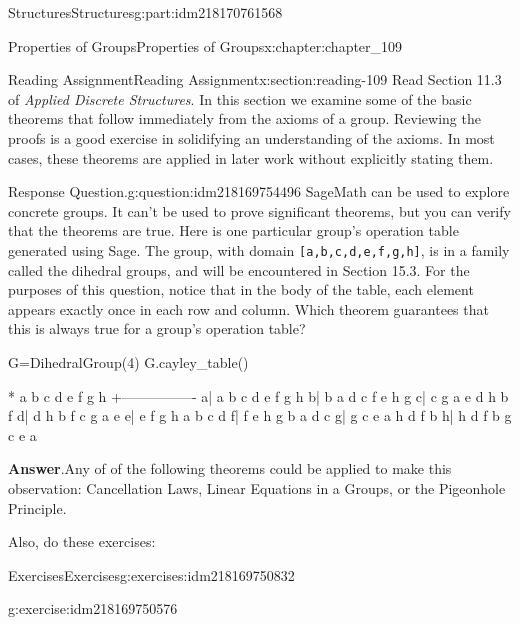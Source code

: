 \documentclass[oneside,10pt,]{book}
\newcommand{\blocktitlefont}{\relax}
\newcommand{\mono}[1]{\texttt{#1}}
\numberwithin{equation}{section}
\begin{document}
\begin{partptx}{Structures}{}{Structures}{}{}{g:part:idm218170761568}
\begin{chapterptx}{Properties of Groups}{}{Properties of Groups}{}{}{x:chapter:chapter_109}
\typeout{************************************************}
%
\begin{sectionptx}{Reading Assignment}{}{Reading Assignment}{}{}{x:section:reading-109}
Read Section 11.3 of \emph{Applied Discrete Structures}.  In this section we examine some of the basic theorems that follow immediately from the axioms of a group. Reviewing the proofs is a good exercise in solidifying an understanding of the axioms. In most cases, these theorems are applied in later work without explicitly stating them.%
\begin{question}{Response Question.}{g:question:idm218169754496}%
SageMath can be used to explore concrete groups.  It can't be used to prove significant theorems, but you can verify that the theorems are true.  Here is one particular group's operation table generated using Sage. The group, with domain \mono{[a,b,c,d,e,f,g,h]}, is in a family called the dihedral groups, and will be encountered in Section 15.3. For the purposes of this question, notice that in the body of the table, each element appears exactly once in each row and column.  Which theorem guarantees that this is always true for a group's operation table?%
\begin{sageinput}
G=DihedralGroup(4)
G.cayley_table()
\end{sageinput}
\begin{sageoutput}
*  a b c d e f g h
 +----------------
a| a b c d e f g h
b| b a d c f e h g
c| c g a e d h b f
d| d h b f c g a e
e| e f g h a b c d
f| f e h g b a d c
g| g c e a h d f b
h| h d f b g c e a
\end{sageoutput}
\par\smallskip%
\noindent\textbf{\blocktitlefont Answer}.\hypertarget{g:answer:idm218169751632}{}\quad{}Any of of the following theorems could be applied to make this observation: Cancellation Laws, Linear Equations in a Groups, or the Pigeonhole Principle.%
\end{question}
Also, do these exercises:%
%
%
\typeout{************************************************}
\typeout{************************************************}
%
\begin{exercises-subsection-numberless}{Exercises}{}{Exercises}{}{}{g:exercises:idm218169750832}
\par\medskip\noindent%
%
\begin{exercisegroup}
\begin{divisionexerciseeg}{1}{}{}{g:exercise:idm218169750576}%

\end{divisionexerciseeg}
\end{exercisegroup}
\end{exercises-subsection-numberless}
\end{sectionptx}
\end{chapterptx}
\end{partptx}
\end{document}
